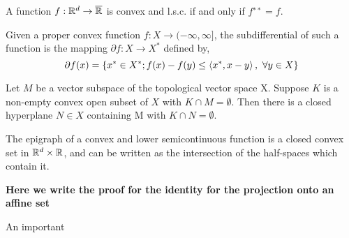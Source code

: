\begin{corollary}
	A function $f:\mathbb{R}^d\rightarrow\overline{\mathbb{R}}$  is convex and l.s.c. if and only if $f^{∗∗}=f$.
\end{corollary}

\begin{definition}[Subdifferential]
	Given a proper convex function $f: X\rightarrow (-\infty, \infty]$, the subdifferential of such a function is the mapping $\partial f: X\rightarrow X^*$ defined by,
	\begin{equation*}
		\partial f (x)= \left\lbrace x^*\in X^*; f(x)-f(y) \leq \left\langle x^*, x-y \right\rangle,\ \forall y \in X \right\rbrace
	\end{equation*}
\end{definition}

\begin{theorem}
	Let $M$ be a vector subspace of the topological vector space X. Suppose $K$ is a non-empty convex open subset of $X$ with $K\cap M=\emptyset$. Then there is a closed hyperplane $N \in X$ containing M with $K \cap N = \emptyset$.
\end{theorem}

\begin{theorem}
	The epigraph of a convex and lower semicontinuous function is a closed convex set in $\mathbb{R}^d\times\mathbb{R}$, and can be written as the intersection of the half-spaces which contain it.
\end{theorem}
	\textbf{Here we write the proof for the identity for the projection onto an affine set}
\begin{definition}
\end{definition}
\begin{theorem}
\end{theorem}

An important 
\begin{definition}[Duality]

\end{definition}

